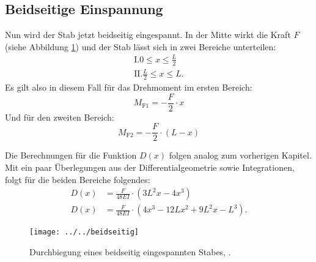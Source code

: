 \subsection{Beidseitige Einspannung}
Nun wird der Stab jetzt beidseitig eingespannt. In der Mitte wirkt die Kraft $F$ (siehe Abbildung \ref{fig:beidseitig})  und der Stab lässt sich in zwei Bereiche unterteilen:
\begin{align}
	\text{I}. 0 \leq x \leq \frac{L}{2} \\
	\text{II}. \frac{L}{2} \leq x \leq L.
\end{align}
Es gilt also in diesem Fall für das Drehmoment im ersten Bereich:
\begin{equation*}
M_\text{F1} = -\frac{F}{2} \cdot x
\end{equation*}
Und für den zweiten Bereich:
\begin{equation*}
M_\text{F2} = -\frac{F}{2} \cdot (L-x)
\end{equation*}

Die Berechnungen für die Funktion $D(x)$ folgen analog zum vorherigen Kapitel. Mit ein paar Überlegungen aus der Differentialgeometrie sowie Integrationen, folgt für die beiden Bereiche folgendes:
\begin{align}
D(x) &= \frac{F}{48EI} \cdot (3L^2x - 4x^3) \\
D(x) &= \frac{F}{48EI} \cdot (4x^3 - 12Lx^2 + 9L^2x - L^3).
\end{align}

\begin{figure}[h!]
	\centering
	\texttt{[image: ../../beidseitig]}
	\caption{Durchbiegung eines beidseitig eingespannten Stabes, \cite[5]{anleitung103}.}
	\label{fig:beidseitig}
\end{figure}